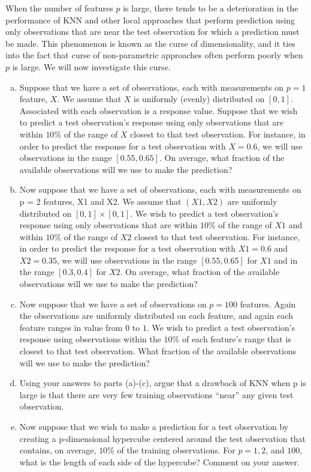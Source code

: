 \documentclass[14pt]{elegantbook}
\begin{document}
\begin{exercise*}[4.4]
  When the number of features $p$ is large, there tends to be a deterioration in the performance of KNN and other local approaches that perform prediction using only observations that are near the test observation for which a prediction must be made. This phenomenon is known as the curse of dimensionality, and it ties into the fact that curse of non-parametric approaches often perform poorly when $p$ is large. We will now investigate this curse. 
  \begin{enumerate}[(a)]
    \item Suppose that we have a set of observations, each with measurements on $p = 1$ feature, $X$. We assume that $X$ is uniformly (evenly) distributed on $[0, 1]$. Associated with each observation is a response value. Suppose that we wish to predict a test observation's response using only observations that are within $10\%$ of the range of $X$ closest to that test observation. For instance, in order to predict the response for a test observation with $X = 0.6$, we will use observations in the range $[0.55,0.65]$. On average, what fraction of the available observations will we use to make the prediction? 
    \item Now suppose that we have a set of observations, each with measurements on p = 2 features, X1 and X2. We assume that $(X1, X2)$ are uniformly distributed on $[0, 1] \times [0, 1]$. We wish to predict a test observation's response using only observations that are within $10 \%$ of the range of $X1$ and within $10 \% $ of the range of $X2$ closest to that test observation. For instance, in order to predict the response for a test observation with $X1 = 0.6$ and $X2 = 0.35$, we will use observations in the range $[0.55, 0.65]$ for $X1$ and in the range $[0.3,0.4]$ for $X2$. On average, what fraction of the available observations will we use to make the prediction? 
    \item Now suppose that we have a set of observations on $p = 100$ features. Again the observations are uniformly distributed on each feature, and again each feature ranges in value from $0$ to $1$. We wish to predict a test observation's response using observations within the $10 \%$ of each feature's range that is closest to that test observation. What fraction of the available observations will we use to make the prediction? 
    \item Using your answers to parts (a)-(c), argue that a drawback of KNN when p is large is that there are very few training observations “near” any given test observation.
    \item Now suppose that we wish to make a prediction for a test observation by creating a p-dimensional hypercube centered around the test observation that contains, on average, $10 \%$ of the training observations. For $p = 1,2$, and $100$, what is the length of each side of the hypercube? Comment on your answer. 
    

\end{enumerate}
\end{exercise*}
\end{document}
